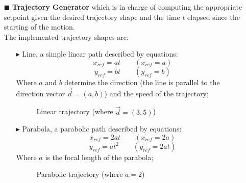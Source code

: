 \begin{itemize}
	\item[\textcolor{BlueGreen}{$\blacksquare$}] \textbf{Trajectory Generator} which is in charge of computing the appropriate 
		setpoint given the desired trajectory shape and the time $t$ elapsed since the starting of the motion. \\
		The implemented trajectory shapes are:
		\begin{itemize}
			\item[$\blacktriangleright$] Line, a simple linear path described by equations:
				\[ x_{ref} = at \qquad (\dot{x_{ref}} = a) \]
				\[ y_{ref} = bt \qquad (\dot{y_{ref}} = b) \] 
				Where $a$ and $b$ determine the direction (the line is parallel to the direction vector $\vec{d}=(a,b)$) and the speed of the trajectory;
				
				\begin{figure}[H]
				\caption{Linear trajectory (where $\vec{d}=(3,5)$)}
				\end{figure}	

			\item[$\blacktriangleright$] Parabola, a parabolic path described by equations: 
				\[x_{ref} = 2at \qquad (\dot{x_{ref}} = 2a)\]
				\[y_{ref} = at^2 \qquad (\dot{y_{ref}} = 2at)\]
				Where $a$ is the focal length of the parabola;
				
				\begin{figure}[H]
				\caption{Parabolic trajectory (where $a = 2$)}
				\end{figure}


\end{itemize}
\end{itemize}
